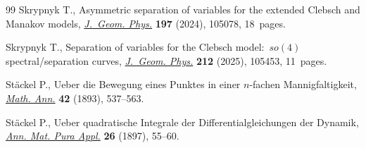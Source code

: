 \begin{thebibliography}{99}
Skrypnyk T., Asymmetric separation of variables for the extended {C}lebsch and
 {M}anakov models,
 \href{https://doi.org/10.1016/j.geomphys.2023.105078}{\textit{J.~Geom.
 Phys.}} \textbf{197} (2024), 105078, 18~pages.

Skrypnyk T., Separation of variables for the {C}lebsch model:~{$so(4)$}
 spectral/separation curves,
 \href{https://doi.org/10.1016/j.geomphys.2025.105453}{\textit{J.~Geom.
 Phys.}} \textbf{212} (2025), 105453, 11~pages.

St\"ackel P., Ueber die {B}ewegung eines {P}unktes in einer {$n$}-fachen
 {M}annigfaltigkeit, \href{https://doi.org/10.1007/BF01447379}{\textit{Math.
 Ann.}} \textbf{42} (1893), 537--563.

St\"ackel P., Ueber quadratische Integrale der Differentialgleichungen der
 Dynamik, \href{https://doi.org/10.1007/BF02580501}{\textit{Ann. Mat. Pura
 Appl.}} \textbf{26} (1897), 55--60.

\end{thebibliography}

